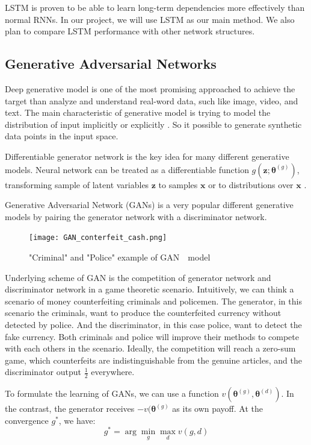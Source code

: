 LSTM is proven to be able to learn long-term dependencies more effectively than normal RNNs. In our project, we will use LSTM as our main method. We also plan to compare LSTM performance with other network structures.

\subsection{Generative Adversarial Networks}
Deep generative model is one of the most promising approached to achieve the target than analyze and understand real-word data, such like image, video, and text. The main characteristic of generative model is trying to model the distribution of input implicitly or explicitly \cite{christopher2006prml}. So it possible to generate synthetic data points in the input space.

Differentiable generator network is the key idea for many different generative models. Neural network can be treated as a differentiable function $ g(\bm{z};\bm{\theta}^{(g)}) $, transforming sample of latent variables $ \mathbf{z} $ to samples $ \mathbf{x} $ or to distributions over $ \mathbf{x} $ \cite{goodfellow2016deeplearning}.

Generative Adversarial Network (GANs) \cite{goodfellow2014gan} is a very popular different generative models by pairing the generator network with a discriminator network.

\begin{figure}[htbp]
	\centering
	\texttt{[image: GAN\_conterfeit\_cash.png]}
	\caption{"Criminal" and "Police" example of GAN　model}
	\label{fig:GANcash}
\end{figure}

Underlying scheme of GAN is the competition of generator network and discriminator network in a game theoretic scenario. Intuitively, we can think a scenario of money counterfeiting criminals and policemen. The generator, in this scenario the criminals, want to produce the counterfeited currency without detected by police. And the discriminator, in this case police, want to detect the fake currency. Both criminals and police will improve their methods to compete with each others in the scenario. Ideally,  the competition will reach a zero-sum game, which counterfeits are indistinguishable from the genuine articles, and the discriminator output $ \frac{1}{2} $ everywhere.
 
To formulate the learning of GANs, we can use a function $ v(\bm{\theta}^{(g)}, \bm{\theta}^{(d)}) $. In the contrast, the generator receives $ -v(\bm{\theta}^{(g)} $ as its own payoff. At the convergence $ g^* $, we have:
\[ g^* = \arg \min_{g} \max_{d}v(g, d) \]

